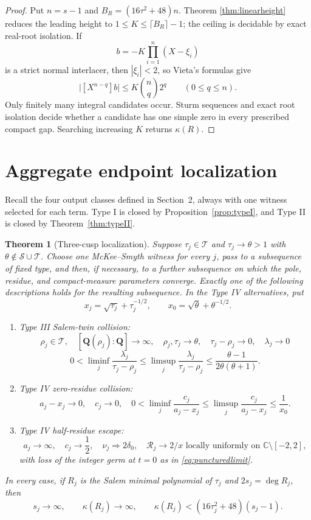\documentclass[11pt,reqno]{amsart}
\newtheorem{theorem}{Theorem}[section]
\theoremstyle{definition}
\theoremstyle{remark}
\newcommand{\Q}{\mathbf Q}
\newcommand{\calS}{\mathcal S}
\newcommand{\calT}{\mathcal T}
\begin{document}
\begin{proof}
Put $n=s-1$ and $B_R=(16\tau^2+48)n$.  Theorem
\ref{thm:linearheight} reduces the leading height to
$1\le K\le\lceil B_R\rceil-1$; the ceiling is decidable by exact real-root
isolation.  If
\[
 b=-K\prod_{i=1}^{n}(X-\xi_i)
\]
is a strict normal interlacer, then $|\xi_i|<2$, so Vieta's formulas give
\[
 \bigl|[X^{n-q}]b\bigr|\le K\binom{n}{q}2^q
 \qquad(0\le q\le n).
\]
Only finitely many integral candidates occur.  Sturm sequences and exact
root isolation decide whether a candidate has one simple zero in every
prescribed compact gap.  Searching increasing $K$ returns $\kappa(R)$.
\end{proof}

\section{Aggregate endpoint localization}

Recall the four output classes defined in Section~2, always with one witness
selected for each term.  Type I is closed by
Proposition~\ref{prop:typeI}, and Type II is closed by
Theorem~\ref{thm:typeII}.

\begin{theorem}[Three-cusp localization]\label{thm:aggregate}
Suppose $\tau_j\in\calT$ and $\tau_j\to\theta>1$ with
$\theta\notin\calS\cup\calT$.  Choose one McKee--Smyth witness for every
$j$, pass to a subsequence of fixed type, and then, if necessary, to a
further subsequence on which the pole, residue, and compact-measure
parameters converge.  Exactly one of the following descriptions holds for
the resulting subsequence.  In the Type IV alternatives, put
\[
 x_j=\sqrt{\tau_j}+\tau_j^{-1/2},\qquad
 x_0=\sqrt\theta+\theta^{-1/2}.
\]
\begin{enumerate}[label=\textup{(\Roman*)}]
\item \emph{Type III Salem-twin collision:}
\[
 \rho_j\in\calT,\quad [\Q(\rho_j):\Q]\to\infty,\quad
 \rho_j,\tau_j\to\theta,\quad \tau_j-\rho_j\to0,\quad
 \lambda_j\to0
\]
\[
 0<\liminf_j\frac{\lambda_j}{\tau_j-\rho_j}
 \le\limsup_j\frac{\lambda_j}{\tau_j-\rho_j}
 \le\frac{\theta-1}{2\theta(\theta+1)}.
\]
\item \emph{Type IV zero-residue collision:}
\[
 a_j-x_j\to0,\quad c_j\to0,\quad
 0<\liminf_j\frac{c_j}{a_j-x_j}
 \le\limsup_j\frac{c_j}{a_j-x_j}\le\frac1{x_0}.
\]
\item \emph{Type IV half-residue escape:}
\[
 a_j\to\infty,\quad c_j\to\frac12,\quad
 \nu_j\Rightarrow2\delta_0,\quad \mathcal R_j\to2/x
 \text{ locally uniformly on }\mathbb C\setminus[-2,2],
\]
with loss of the integer germ at $t=0$ as in \eqref{eq:puncturedlimit}.
\end{enumerate}
In every case, if $R_j$ is the Salem minimal polynomial of $\tau_j$ and
$2s_j=\deg R_j$, then
\begin{equation}\label{eq:aggregateheight}
 s_j\to\infty,\qquad \kappa(R_j)\to\infty,\qquad
 \kappa(R_j)<(16\tau_j^2+48)(s_j-1).
\end{equation}
\end{theorem}
\end{document}

